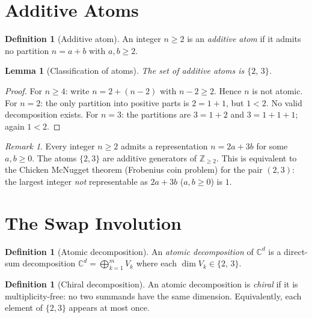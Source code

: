\documentclass[12pt]{amsart}
\newtheorem{lemma}[theorem]{Lemma}
\theoremstyle{definition}
\newtheorem{definition}[theorem]{Definition}
\theoremstyle{remark}
\newtheorem{remark}[theorem]{Remark}
\newcommand{\CC}{\mathbb{C}}
\newcommand{\ZZ}{\mathbb{Z}}
\begin{document}
\section{Additive Atoms}
\label{sec:atoms}

\begin{definition}[Additive atom]
\label{def:atom}
An integer $n \ge 2$ is an \emph{additive atom}
if it admits no partition $n = a + b$
with $a, b \ge 2$.
\end{definition}

\begin{lemma}[Classification of atoms]
\label{lem:atoms}
The set of additive atoms is $\{2,\, 3\}$.
\end{lemma}

\begin{proof}
For $n \ge 4$: write $n = 2 + (n-2)$ with $n - 2 \ge 2$.
Hence $n$ is not atomic.
For $n = 2$: the only partition into positive parts is
$2 = 1 + 1$, but $1 < 2$. No valid decomposition exists.
For $n = 3$: the partitions are $3 = 1 + 2$ and
$3 = 1 + 1 + 1$; again $1 < 2$.
\end{proof}

\begin{remark}
\label{rem:generators}
Every integer $n \ge 2$ admits a representation
$n = 2a + 3b$ for some $a, b \ge 0$.
The atoms $\{2, 3\}$ are additive generators of
$\ZZ_{\ge 2}$.
This is equivalent to the Chicken McNugget theorem
(Frobenius coin problem) for the pair $(2, 3)$:
the largest integer \emph{not} representable
as $2a + 3b$ ($a, b \ge 0$) is $1$.
\end{remark}

\section{The Swap Involution}
\label{sec:swap}

\begin{definition}[Atomic decomposition]
\label{def:atomic_decomp}
An \emph{atomic decomposition} of $\CC^d$ is a
direct-sum decomposition
$\CC^d = \bigoplus_{k=1}^{m} V_k$
where each $\dim V_k \in \{2,\, 3\}$.
\end{definition}

\begin{definition}[Chiral decomposition]
\label{def:chiral}
An atomic decomposition is \emph{chiral} if
it is multiplicity-free: no two summands
have the same dimension.
Equivalently, each element of $\{2, 3\}$
appears at most once.
\end{definition}
\end{document}
